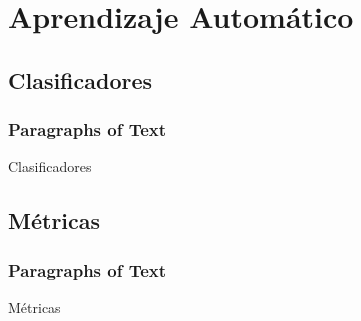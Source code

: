 \section{Aprendizaje Automático}

\subsection{Clasificadores}
\begin{frame}
    \frametitle{Paragraphs of Text}
    Clasificadores
\end{frame}

\subsection{Métricas}
\begin{frame}
    \frametitle{Paragraphs of Text}
    Métricas
\end{frame}

